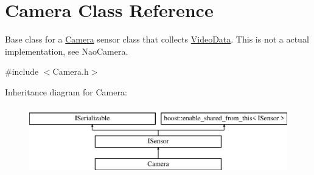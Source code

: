 \hypertarget{class_camera}{}\section{Camera Class Reference}
\label{class_camera}


Base class for a \hyperlink{class_camera}{Camera} sensor class that collects \hyperlink{class_video_data}{Video\+Data}. This is not a actual implementation, see Nao\+Camera.  




{\ttfamily \#include $<$Camera.\+h$>$}

Inheritance diagram for Camera\+:\begin{figure}[H]
\begin{center}
\leavevmode
\includegraphics[height=3.000000cm]{class_camera}
\end{center}
\end{figure}
